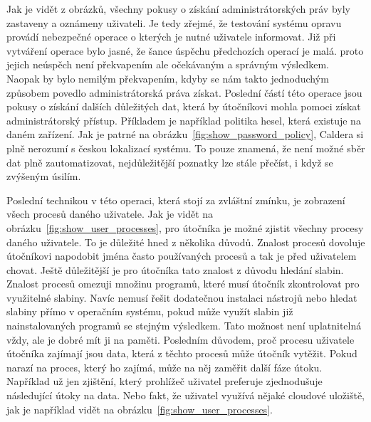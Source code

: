Jak je vidět z obrázků, všechny pokusy o získání administrátorských práv byly zastaveny a oznámeny uživateli.
Je tedy zřejmé, že testování systému opravu provádí nebezpečné operace o kterých je nutné uživatele informovat.
Již při vytváření operace bylo jasné, že šance úspěchu předchozích operací je malá.
proto jejich neúspěch není překvapením ale očekávaným a správným výsledkem.
Naopak by bylo nemilým překvapením, kdyby se nám takto jednoduchým způsobem povedlo administrátorská práva získat.
Poslední částí této operace jsou pokusy o získání dalších důležitých dat, která by útočníkovi mohla pomoci získat administrátorský přístup.
Příkladem je například politika hesel, která existuje na daném zařízení.
Jak je patrné na obrázku~\ref{fig:show_password_policy}, Caldera si plně nerozumí s českou lokalizací systému.
To pouze znamená, že není možné sběr dat plně zautomatizovat, nejdůležitější poznatky lze stále přečíst, i když se zvýšeným úsilím.


Poslední technikou v této operaci, která stojí za zvláštní zmínku, je zobrazení všech procesů daného uživatele.
Jak je vidět na obrázku~\ref{fig:show_user_processes}, pro útočníka je možné zjistit všechny procesy daného uživatele.
To je důležité hned z několika důvodů.
Znalost procesů dovoluje útočníkovi napodobit jména často používaných procesů a tak je před uživatelem chovat.
Ještě důležitější je pro útočníka tato znalost z důvodu hledání slabin.
Znalost procesů omezuji množinu programů, které musí útočník zkontrolovat pro využitelné slabiny.
Navíc nemusí řešit dodatečnou instalaci nástrojů nebo hledat slabiny přímo v operačním systému, pokud může využít slabin již nainstalovaných programů se stejným výsledkem.
Tato možnost není uplatnitelná vždy, ale je dobré mít ji na paměti.
Posledním důvodem, proč procesu uživatele útočníka zajímají jsou data, která z těchto procesů může útočník vytěžit.
Pokud narazí na proces, který ho zajímá, může na něj zaměřit další fáze útoku.
Například už jen zjištění, který prohlížeč uživatel preferuje zjednodušuje následující útoky na data.
Nebo fakt, že uživatel využívá nějaké cloudové uložiště, jak je například vidět na obrázku~\ref{fig:show_user_processes}.


